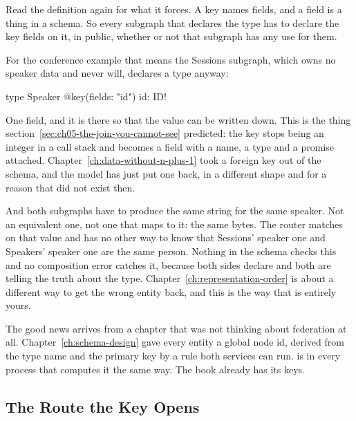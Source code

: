 %
Read the definition again for what it forces. A key names fields, and a field
is a thing in a schema. So every subgraph that declares the type has to declare
the key fields on it, in public, whether or not that subgraph has any use for
them.

%
For the conference example that means the Sessions subgraph, which owns no
speaker data and never will, declares a  type anyway:

\begin{graphqlsdl}
type Speaker @key(fields: "id") {
  id: ID!
}
\end{graphqlsdl}

%
One field, and it is there so that the value can be written down. This is the
thing section~\ref{sec:ch05-the-join-you-cannot-see} predicted: the key stops
being an integer in a call stack and becomes a field with a name, a type and a
promise attached. Chapter~\ref{ch:data-without-n-plus-1} took a foreign key out
of the schema, and the model has just put one back, in a different shape and for
a reason that did not exist then.

%
And both subgraphs have to produce the same string for the same speaker. Not an
equivalent one, not one that maps to it: the same bytes. The router matches on
that value and has no other way to know that Sessions' speaker one and Speakers'
speaker one are the same person. Nothing in the schema checks this and no
composition error catches it, because both sides declare  and
both are telling the truth about the type. Chapter~\ref{ch:representation-order}
is about a different way to get the wrong entity back, and this is the way that
is entirely yours.

%
The good news arrives from a chapter that was not thinking about federation at
all. Chapter~\ref{ch:schema-design} gave every entity a global node id, derived
from the type name and the primary key by a rule both services can run.
 is  in every process that computes it the
same way. The book already has its keys.

\subsection{The Route the Key Opens}

